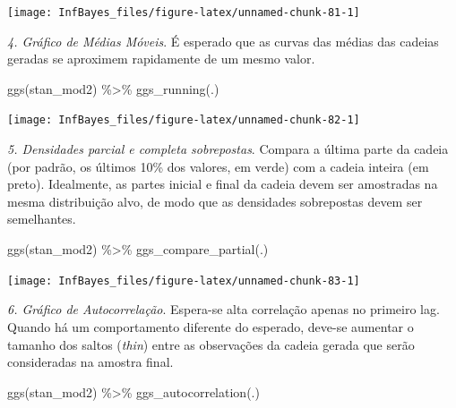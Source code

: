 \documentclass[
]{book}
\newenvironment{Shaded}{\begin{snugshade}}{\end{snugshade}}
\newcommand{\FunctionTok}[1]{\textcolor[rgb]{0.00,0.00,0.00}{#1}}
\newcommand{\NormalTok}[1]{#1}
\newcommand{\SpecialCharTok}[1]{\textcolor[rgb]{0.00,0.00,0.00}{#1}}
\begin{document}
\begin{center}\texttt{[image: InfBayes\_files/figure-latex/unnamed-chunk-81-1]} \end{center}

\emph{4. Gráfico de Médias Móveis}. É esperado que as curvas das médias das cadeias geradas se aproximem rapidamente de um mesmo valor.

\begin{Shaded}
\begin{Highlighting}[]
\FunctionTok{ggs}\NormalTok{(stan\_mod2) }\SpecialCharTok{\%\textgreater{}\%} \FunctionTok{ggs\_running}\NormalTok{(.)}
\end{Highlighting}
\end{Shaded}

\begin{center}\texttt{[image: InfBayes\_files/figure-latex/unnamed-chunk-82-1]} \end{center}

\emph{5. Densidades parcial e completa sobrepostas}. Compara a última parte da cadeia (por padrão, os últimos 10\% dos valores, em verde) com a cadeia inteira (em preto). Idealmente, as partes inicial e final da cadeia devem ser amostradas na mesma distribuição alvo, de modo que as densidades sobrepostas devem ser semelhantes.

\begin{Shaded}
\begin{Highlighting}[]
\FunctionTok{ggs}\NormalTok{(stan\_mod2) }\SpecialCharTok{\%\textgreater{}\%} \FunctionTok{ggs\_compare\_partial}\NormalTok{(.)}
\end{Highlighting}
\end{Shaded}

\begin{center}\texttt{[image: InfBayes\_files/figure-latex/unnamed-chunk-83-1]} \end{center}

\emph{6. Gráfico de Autocorrelação}. Espera-se alta correlação apenas no primeiro lag. Quando há um comportamento diferente do esperado, deve-se aumentar o tamanho dos saltos (\emph{thin}) entre as observações da cadeia gerada que serão consideradas na amostra final.

\begin{Shaded}
\begin{Highlighting}[]
\FunctionTok{ggs}\NormalTok{(stan\_mod2) }\SpecialCharTok{\%\textgreater{}\%} \FunctionTok{ggs\_autocorrelation}\NormalTok{(.)}
\end{Highlighting}
\end{Shaded}
\end{document}
